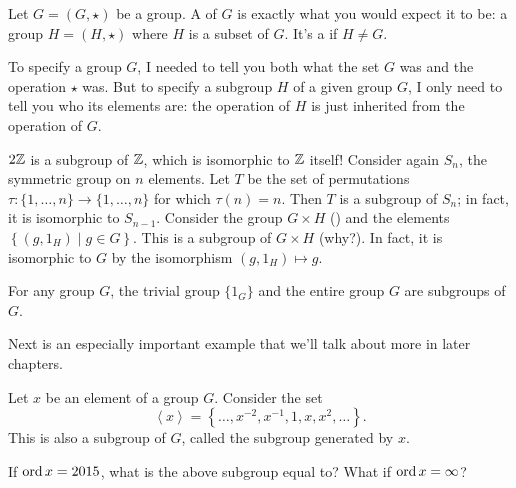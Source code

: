 \begin{definition}
	Let $G = (G, \star)$ be a group.
	A  of $G$ is exactly what you would expect it to be:
	a group $H = (H, \star)$ where $H$ is a subset of $G$.
	It's a  if $H \neq G$.
\end{definition}

\begin{remark}
	To specify a group $G$, I needed to tell you both what the set $G$ was and the operation $\star$ was.
	But to specify a subgroup $H$ of a given group $G$, I only need to tell you who its elements are: the operation of $H$ is just inherited from the operation of $G$.
\end{remark}

\begin{example}
	\listhack
	\begin{enumerate}[(a) ]
		\ii $2\mathbb Z$ is a subgroup of $\mathbb Z$, which is isomorphic to $\mathbb Z$ itself!
		\ii Consider again $S_n$, the symmetric group on $n$ elements.
		Let $T$ be the set of permutations $\tau : \{1, \dots, n\} \to \{1, \dots, n\}$
		for which $\tau(n) = n$.  Then $T$ is a subgroup of $S_n$;
		in fact, it is isomorphic to $S_{n-1}$.
		\ii Consider the group $G \times H$ ()
		and the elements $ \left\{ (g, 1_H) \mid g \in G \right\} $.
		This is a subgroup of $G \times H$ (why?).
		In fact, it is isomorphic to $G$
		by the isomorphism $(g,1_H) \mapsto g$.
	\end{enumerate}
\end{example}
\begin{example}
	For any group $G$, the trivial group $\{1_G\}$
	and the entire group $G$ are subgroups of $G$.
\end{example}

Next is an especially important example that we'll talk about more in later chapters.
\begin{example}
	Let $x$ be an element of a group $G$.
	Consider the set
	\[ \left<x\right> = \left\{ \dots, x^{-2}, x^{-1}, 1, x, x^2, \dots \right\}. \]
	This is also a subgroup of $G$, called the subgroup generated by $x$.
\end{example}
\begin{exercise}
	If $\operatorname{ord} x = 2015$, what is the above subgroup equal to?
	What if $\operatorname{ord} x = \infty$?
\end{exercise}

